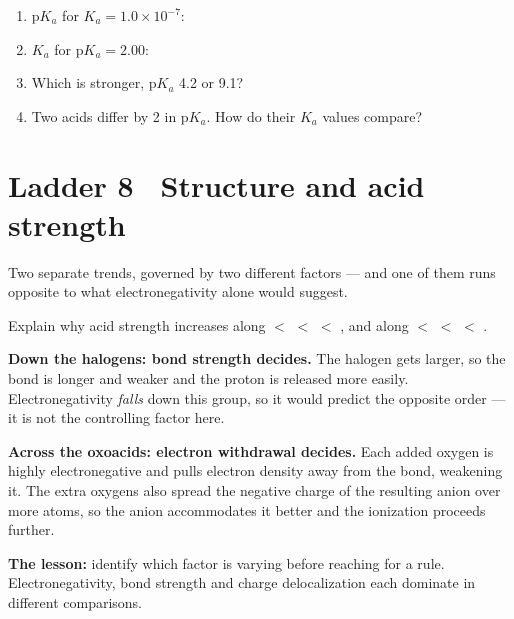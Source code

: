 \documentclass{apchem-worksheet}
\begin{document}
\begin{yourturn}
\begin{enumerate}[leftmargin=*,itemsep=0.5em]
  \item $\mathrm{p}K_a$ for $K_a = 1.0\times10^{-7}$:
        \workspace[1.4cm]
  \item $K_a$ for $\mathrm{p}K_a = 2.00$: \workspace[1.4cm]
  \item Which is stronger, $\mathrm{p}K_a$ \num{4.2} or \num{9.1}?
        \workspace[1.4cm]
  \item Two acids differ by 2 in $\mathrm{p}K_a$. How do their $K_a$
        values compare? \workspace[1.6cm]
\end{enumerate}
\end{yourturn}

\section*{\sffamily Ladder 8 \textbullet\ Structure and acid strength}

Two separate trends, governed by two different factors --- and one of them
runs opposite to what electronegativity alone would suggest.

\begin{workedexample}
Explain why acid strength increases along  $<$  $<$
 $<$ , and along  $<$  $<$ 
$<$ .

\textbf{Down the halogens: bond strength decides.} The halogen gets
larger, so the  bond is longer and weaker and the proton is
released more easily. Electronegativity \emph{falls} down this group, so
it would predict the opposite order --- it is not the controlling factor
here.

\textbf{Across the oxoacids: electron withdrawal decides.} Each added
oxygen is highly electronegative and pulls electron density away from the
 bond, weakening it. The extra oxygens also spread the negative
charge of the resulting anion over more atoms, so the anion accommodates
it better and the ionization proceeds further.

\textbf{The lesson:} identify which factor is varying before reaching for
a rule. Electronegativity, bond strength and charge delocalization each
dominate in different comparisons.
\end{workedexample}
\end{document}
